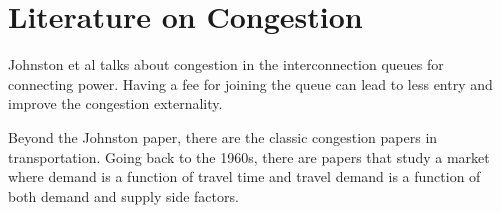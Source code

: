 \documentclass[12pt]{article}
\theoremstyle{definition}
\begin{document}
\section{Literature on Congestion}
Johnston et al talks about congestion in the interconnection queues for connecting power. Having a fee for joining the queue can lead to less entry and improve the congestion externality. 

Beyond the Johnston paper, there are the classic congestion papers in transportation. Going back to the 1960s, there are papers that study a market where demand is a function of travel time and travel demand is a function of both demand and supply side factors. 
\end{document}
